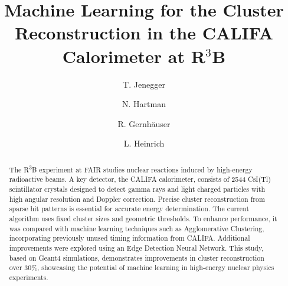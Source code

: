 \documentclass[final,5p,times,twocolumn]{elsarticle}
\begin{document}
\begin{frontmatter}



\title{Machine Learning for the Cluster Reconstruction in the CALIFA Calorimeter at R$^3$B}

\author[1]{T. Jenegger}
\author[1]{N. Hartman}
\author[1]{R. Gernhäuser}
\author[1]{L. Heinrich}
\address[1]{{Technische Universität München},%
            {James-Franck-Str 1}, 
            {Garching b. München},
            {85748},
            {Germany}}

\begin{abstract}
The R\textsuperscript{3}B experiment at FAIR studies nuclear reactions induced by high-energy radioactive beams. A key detector, the CALIFA calorimeter, consists of 2544 CsI(Tl) scintillator crystals designed to detect gamma rays and light charged particles with high angular resolution and Doppler correction.\newline
Precise cluster reconstruction from sparse hit patterns is essential for accurate energy determination. The current algorithm uses fixed cluster sizes and geometric thresholds. To enhance performance, it was compared with machine learning techniques such as Agglomerative Clustering, incorporating previously unused timing information from CALIFA. Additional improvements were explored using an Edge Detection Neural Network.\newline
This study, based on Geant4 simulations, demonstrates improvements in cluster reconstruction over 30\%, showcasing the potential of machine learning in high-energy nuclear physics experiments.
\end{abstract}


\end{frontmatter}
\end{document}
